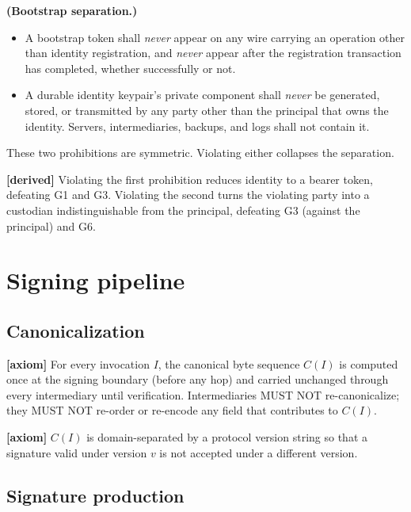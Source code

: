 \documentclass[11pt,a4paper]{article}
\newcommand{\axiom}{\textcolor{axiomcolor}{\textbf{[axiom]}}\xspace}
\newcommand{\derived}{\textcolor{derivedcolor}{\textbf{[derived]}}\xspace}
\begin{document}
\begin{invariant}
\textbf{(Bootstrap separation.)}
\begin{itemize}[leftmargin=1.4em,itemsep=0.1em]
    \item A bootstrap token shall \emph{never} appear on any wire
    carrying an operation other than identity registration, and
    \emph{never} appear after the registration transaction has
    completed, whether successfully or not.
    \item A durable identity keypair's private component shall
    \emph{never} be generated, stored, or transmitted by any party
    other than the principal that owns the identity. Servers,
    intermediaries, backups, and logs shall not contain it.
\end{itemize}
These two prohibitions are symmetric. Violating either collapses the
separation.
\end{invariant}

\derived{} Violating the first prohibition reduces identity to a
bearer token, defeating G1 and G3. Violating the second turns the
violating party into a custodian indistinguishable from the
principal, defeating G3 (against the principal) and G6.

\section{Signing pipeline}
\label{sec:sign}

\subsection{Canonicalization}

\axiom{} For every invocation $I$, the canonical byte sequence $C(I)$
is computed once at the signing boundary (before any hop) and carried
unchanged through every intermediary until verification. Intermediaries
MUST NOT re-canonicalize; they MUST NOT re-order or re-encode any
field that contributes to $C(I)$.

\axiom{} $C(I)$ is domain-separated by a protocol version string so
that a signature valid under version $v$ is not accepted under a
different version.

\subsection{Signature production}
\end{document}
